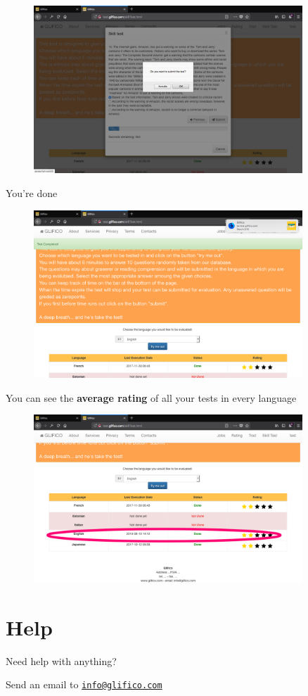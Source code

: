 \documentclass[11 pt, a4paper]{article}
\begin{document}
\begin{figure}[H]
\centering
\includegraphics[width=0.9\textwidth]{translator_skilltest7.png}
\end{figure}


\clearpage
You're done
\begin{figure}[H]
\centering
\includegraphics[width=0.9\textwidth]{translator_skilltest8.png}
\end{figure}

You can see the \textbf{average rating} of all your tests in every language
\begin{figure}[H]
\centering
\includegraphics[width=0.9\textwidth]{translator_skilltest9.png}
\end{figure}


\clearpage
\section{Help}
Need help with anything?

Send an email to \href{mailto:info@glifico.com}{\nolinkurl{info@glifico.com}}
\end{document}
